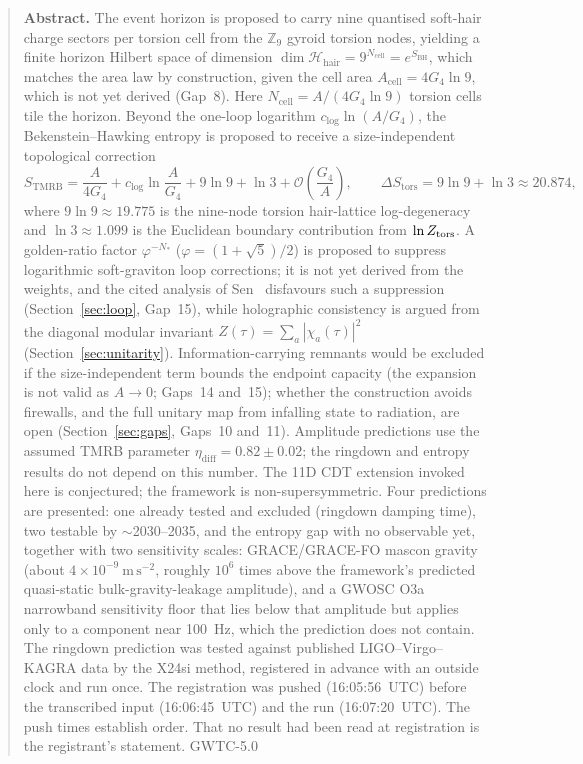 \documentclass[11pt,a4paper]{article}
\renewenvironment{abstract}{%
  \begin{quote}\small\textbf{Abstract.}\quad\ignorespaces}%
  {\end{quote}}
\begin{document}
\begin{abstract}
The event horizon is proposed to carry nine quantised soft-hair charge sectors per
torsion cell from the $\mathbb{Z}_9$ gyroid torsion nodes, yielding a finite
horizon Hilbert space of dimension
$\dim\mathcal{H}_{\mathrm{hair}} = 9^{N_{\mathrm{cell}}} = e^{S_{\mathrm{BH}}}$,
which matches the area law by construction, given the cell area
$A_{\mathrm{cell}} = 4G_4\ln 9$, which is not yet derived (Gap~8). Here
$N_{\mathrm{cell}} = A/(4G_4\ln 9)$ torsion cells tile the horizon.
Beyond the one-loop logarithm $c_{\log}\ln(A/G_4)$, the Bekenstein--Hawking
entropy is proposed to receive a size-independent topological correction
\[
  S_{\mathrm{TMRB}} = \frac{A}{4G_4} + c_{\log}\ln\frac{A}{G_4} + 9\ln 9 + \ln 3
    + \mathcal{O}\!\left(\frac{G_4}{A}\right),
  \qquad \Delta S_{\mathrm{tors}} = 9\ln 9 + \ln 3 \approx 20.874,
\]
where $9\ln 9 \approx 19.775$ is the nine-node torsion hair-lattice log-degeneracy
and $\ln 3 \approx 1.099$ is the Euclidean boundary contribution from
$\ln Z_{\rm tors}$.  A golden-ratio factor
$\varphi^{-N_*}$ ($\varphi = (1+\sqrt{5})/2$) is proposed to suppress
logarithmic soft-graviton loop corrections; it is not yet derived from the
weights, and the cited analysis of Sen~\cite{Sen2012} disfavours such a suppression (Section~\ref{sec:loop}, Gap~15), while
holographic consistency is argued from the diagonal modular invariant
$Z(\tau)=\sum_a|\chi_a(\tau)|^2$ (Section~\ref{sec:unitarity}).
Information-carrying remnants would be excluded if the size-independent term bounds the endpoint capacity (the expansion is not valid as $A\to 0$; Gaps~14 and~15); whether the construction
avoids firewalls, and the full unitary map from infalling state to radiation,
are open (Section~\ref{sec:gaps}, Gaps~10 and~11).  Amplitude predictions use the assumed TMRB parameter $\eta_{\mathrm{diff}} = 0.82\pm 0.02$; the ringdown and entropy results do not depend on this number.  The 11D CDT extension
invoked here is conjectured; the framework is non-supersymmetric.  Four predictions are presented: one already tested and excluded (ringdown damping time), two testable by $\sim$2030--2035, and the entropy gap with no observable yet, together with
two sensitivity scales: GRACE/GRACE-FO mascon gravity (about
$4\times10^{-9}~\mathrm{m\,s^{-2}}$, roughly $10^{6}$ times above the framework's predicted
quasi-static bulk-gravity-leakage amplitude), and a GWOSC O3a
narrowband sensitivity floor that lies below that amplitude but applies only to a
component near 100~Hz, which the prediction does not contain. The ringdown
prediction was tested against published LIGO--Virgo--KAGRA data by the X24si method, registered in advance with an outside clock and run once. The registration was pushed (16:05:56~UTC) before the transcribed input (16:06:45~UTC) and the run (16:07:20~UTC). The push times establish order. That no result had been read at registration is the registrant's statement. GWTC-5.0

\end{abstract}
\end{document}
